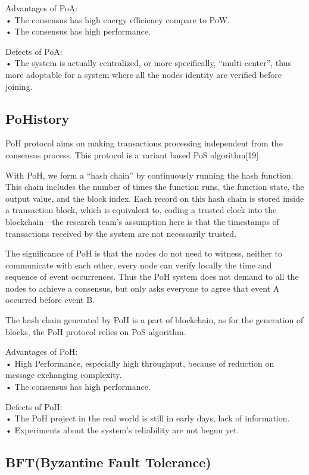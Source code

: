 \documentclass[doublespacing]{bmcart}
\begin{document}
\begin{CJK*}{UTF8}{gbsn}
Advantages of PoA:
\\• The consensus has high energy efficiency compare to PoW.
\\• The consensus has high performance.
	 
Defects of PoA:
\\• The system is actually centralized, or more specifically, ``multi-center'', thus more adoptable for a system where all the nodes identity are verified before joining.
	
	\subsection{PoHistory}
	 
	PoH protocol aims on making transactions processing independent from the consensus process. This protocol is a variant based PoS algorithm[19].
	 
	With PoH, we form a ``hash chain'' by continuously running the hash function. This chain includes the number of times the function runs, the function state, the output value, and the block index. Each record on this hash chain is stored inside a transaction block, which is equivalent to, coding a trusted clock into the blockchain—the research team's assumption here is that the timestamps of transactions received by the system are not necessarily trusted.
	 
	The significance of PoH is that  the nodes do not need to witness, neither to communicate with each other, every node can verify locally the time and sequence of event occurrences. Thus the PoH system does not demand to all the nodes to achieve a consensus, but only asks everyone to agree that event A occurred before event B.
	 
	The hash chain generated by PoH is a part of blockchain, as for the generation of blocks, the PoH protocol relies on PoS algorithm.
	
	 
Advantages of PoH:
\\• High Performance, especially high throughput, because of reduction on message exchanging complexity.
\\• The consensus has high performance.
	 
Defects of PoH:
\\• The PoH project in the real world is still in early days, lack of information.
\\• Experiments about the system's reliability are not begun yet. 
	
	\subsection{BFT(Byzantine Fault Tolerance)}
	 

\end{CJK*}
\end{document}
